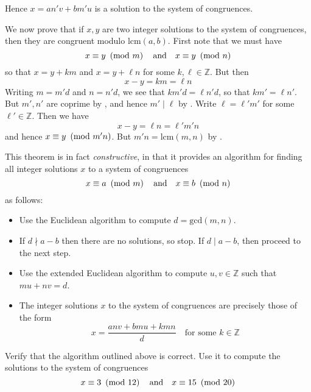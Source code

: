 \begin{cproof}
\begin{itemize}
Hence $x = an'v+bm'u$ is a solution to the system of congruences.
\end{itemize}

We now prove that if $x,y$ are two integer solutions to the system of congruences, then they are congruent modulo $\mathrm{lcm}(a,b)$. First note that we must have
\[ x \equiv y ~\left(\text{mod}~m\right) \quad \text{and} \quad x \equiv y ~\left(\text{mod}~n\right) \]
so that $x=y+km$ and $x=y+\ell n$ for some $k,\ell \in \mathbb{Z}$. But then
\[ x-y=km=\ell n \]
Writing $m=m'd$ and $n=n'd$, we see that $km'd = \ell n'd$, so that $km' = \ell n'$. But $m',n'$ are coprime by , and hence $m' \mid \ell$ by . Write $\ell = \ell'm'$ for some $\ell' \in \mathbb{Z}$. Then we have
\[ x-y = \ell n = \ell' m' n \]
and hence $x \equiv y ~\left(\text{mod}~m'n\right)$. But $m'n = \mathrm{lcm}(m,n)$ by .
\end{cproof}

This theorem is in fact \textit{constructive}, in that it provides an algorithm for finding all integer solutions $x$ to a system of congruences
\[ x \equiv a ~\left(\text{mod}~m\right) \quad \text{and} \quad x \equiv b ~\left(\text{mod}~n\right) \]
as follows:
\begin{itemize}
\item Use the Euclidean algorithm to compute $d=\mathrm{gcd}(m,n)$.
\item If $d \nmid a-b$ then there are no solutions, so stop. If $d \mid a-b$, then proceed to the next step.
\item Use the extended Euclidean algorithm to compute $u,v \in \mathbb{Z}$ such that $mu+nv=d$.
\item The integer solutions $x$ to the system of congruences are precisely those of the form
\[ x = \frac{anv + bmu + kmn}{d} \quad \text{for some } k \in \mathbb{Z} \]
\end{itemize}

\begin{exercise}
\label{exCRTAlgorithm}
Verify that the algorithm outlined above is correct. Use it to compute the solutions to the system of congruences
\[ x \equiv 3 ~\left(\text{mod}~12\right) \quad \text{and} \quad x \equiv 15 ~\left(\text{mod}~20\right) \]
\end{exercise}

